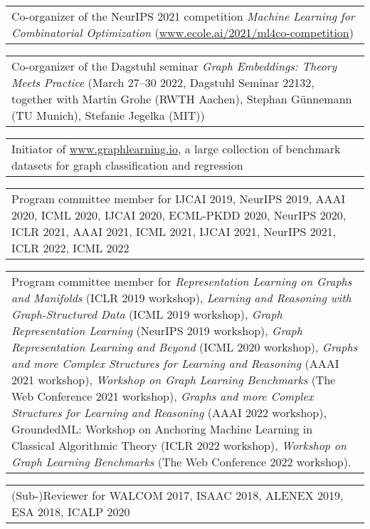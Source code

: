 \documentclass[11pt, a4paper, DIV=12]{scrartcl}
\begin{document}
\begin{tabular}{p{14.5cm}}
Co-organizer of the NeurIPS 2021 competition \emph{Machine Learning for Combinatorial Optimization} (\url{www.ecole.ai/2021/ml4co-competition}) \\[0.5em]	
\end{tabular}

\begin{tabular}{p{14.5cm}}
Co-organizer of the Dagstuhl seminar \emph{Graph Embeddings: Theory Meets Practice} (March 27–30 2022, Dagstuhl Seminar 22132, together with Martin Grohe (RWTH Aachen), Stephan Günnemann (TU Munich), Stefanie Jegelka (MIT)) \\[0.5em]
\end{tabular}

\begin{tabular}{p{14.5cm}}
Initiator of \url{www.graphlearning.io}, a large collection of benchmark datasets for graph classification and regression\\[0.5em]
\end{tabular}

\begin{tabular}{p{14.5cm}}	
Program committee member for IJCAI 2019, NeurIPS  2019, AAAI 2020, ICML 2020, IJCAI 2020, ECML-PKDD 2020, NeurIPS 2020, ICLR 2021, AAAI 2021, ICML 2021, IJCAI 2021,  NeurIPS 2021, ICLR 2022, ICML 2022 \\[0.5em]
\end{tabular}

\begin{tabular}{p{14.5cm}}
Program committee member for \emph{Representation Learning on Graphs and Manifolds} (ICLR 2019 workshop), \emph{Learning and Reasoning with Graph-Structured Data} (ICML 2019 workshop), \emph{Graph Representation Learning} (NeurIPS 2019 workshop), \emph{Graph Representation Learning and Beyond} (ICML 2020 workshop), \emph{Graphs and more Complex Structures for Learning and Reasoning} (AAAI 2021 workshop), \emph{Workshop on Graph Learning Benchmarks} (The Web Conference 2021 workshop),  \emph{Graphs and more Complex Structures for Learning and Reasoning} (AAAI 2022 workshop), GroundedML: Workshop on Anchoring Machine Learning in Classical Algorithmic Theory (ICLR 2022 workshop), \emph{Workshop on Graph Learning Benchmarks} (The Web Conference 2022 workshop). \\[0.5em]
\end{tabular}

\begin{tabular}{p{14.5cm}}
(Sub-)Reviewer for WALCOM 2017, ISAAC 2018, ALENEX 2019, ESA 2018, ICALP 2020 \\[0.5em]
\end{tabular}
\end{document}
